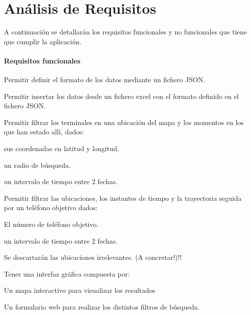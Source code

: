 \section{Análisis de Requisitos\label{SEC:ANALISIS}}
  A continuación se detallarán los requisitos funcionales y no funcionales que tiene que cumplir la aplicación.
  \paragraph{Requisitos funcionales}
  
  \begin{functional}
    \item Permitir definir el formato de los datos mediante un fichero JSON.
    \item Permitir insertar los datos desde un fichero excel con el formato definido en el fichero JSON.
    
    \item Permitir filtrar los terminales en una ubicación del mapa y los momentos en los que han estado allí, dados:
    \begin{functional}
      \item sus coordenadas en latitud y longitud.
      \item un radio de búsqueda.
      \item un intervalo de tiempo entre 2 fechas.
    \end{functional} 
    \item Permitir filtrar las ubicaciones, los instantes de tiempo y la trayectoria seguida por un teléfono objetivo dados:
    \begin{functional}
      \item El número de teléfono objetivo.
      \item un intervalo de tiempo entre 2 fechas.
    \end{functional} 
    \item Se descartarán las ubicaciones irrelevantes. (A concretar!)!! %
    \item Tener una interfaz gráfica compuesta por:
    \begin{functional}
      \item Un mapa interactivo para visualizar los resultados
      \item Un formulario web para realizar los distintos filtros de búsqueda.
    \end{functional}
  \end{functional}
  
